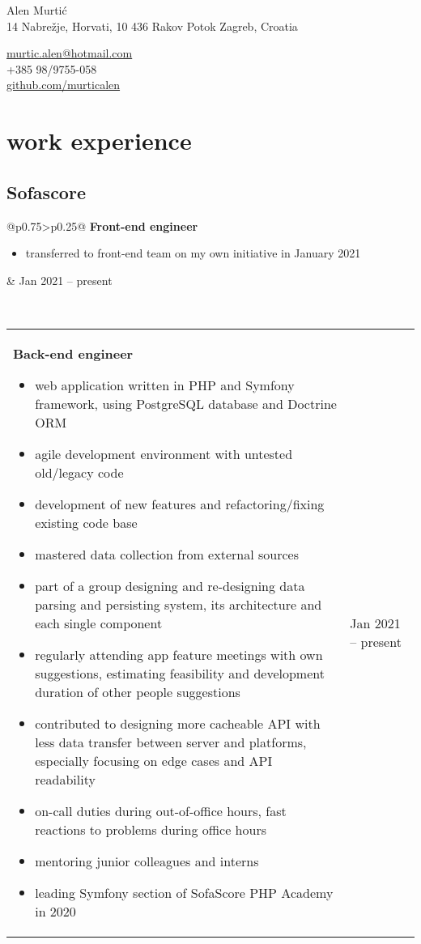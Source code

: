 \documentclass[a4paper]{article}
\makeatletter
\newlength{\tablewidth}
\newenvironment{period}[2]{%
\newcommand{\sarma}{#2}%
\setlength{\tablewidth}{\linewidth}
\addtolength{\tablewidth}{-2\tabcolsep}
\begin{tabular}{@{}p{0.75\tablewidth}>{\raggedleft\arraybackslash}p{0.25\tablewidth}@{}}%
#1 \newline
\begin{itemize}
}{%
\end{itemize} & \sarma \\%
\end{tabular}\\
}
\makeatother
\begin{document}
\fontfamily{\sfdefault}
\selectfont

\begin{minipage}{.5\textwidth}
\LARGE{Alen Murtić}\\
\normalsize{14 Nabrežje, Horvati, 10 436 Rakov Potok
	\newline
	Zagreb, Croatia}
\end{minipage}%
\begin{minipage}{.5\textwidth}
\raggedleft
\href{mailto:murtic.alen@hotmail.com}{murtic.alen@hotmail.com} \\
+385 98/9755-058 \\
\href{https://github.com/murticalen}{github.com/murticalen}
\end{minipage}

\vspace{1em}

\section{work experience}

\subsection{Sofascore}
\begin{period}{\textbf{Front-end engineer}}{Jan 2021 -- present}
\item transferred to front-end team on my own initiative in January 2021
\end{period}
\begin{period}{\textbf{Back-end engineer}}{Jun 2017 -- Dec 2020}
    \item web application written in PHP and Symfony framework, using PostgreSQL database and Doctrine ORM
    \item agile development environment with untested old/legacy code
    \item development of new features and refactoring/fixing existing code base
    \item mastered data collection from external sources
    \item part of a group designing and re-designing data parsing and persisting system, its architecture and each single component
    \item regularly attending app feature meetings with own suggestions, estimating feasibility and development duration of other people suggestions
    \item contributed to designing more cacheable API with less data transfer between server and platforms, especially focusing on edge cases and API readability
    \item on-call duties during out-of-office hours, fast reactions to problems during office hours
    \item mentoring junior colleagues and interns
    \item leading Symfony section of SofaScore PHP Academy in 2020
\end{period}
\end{document}
